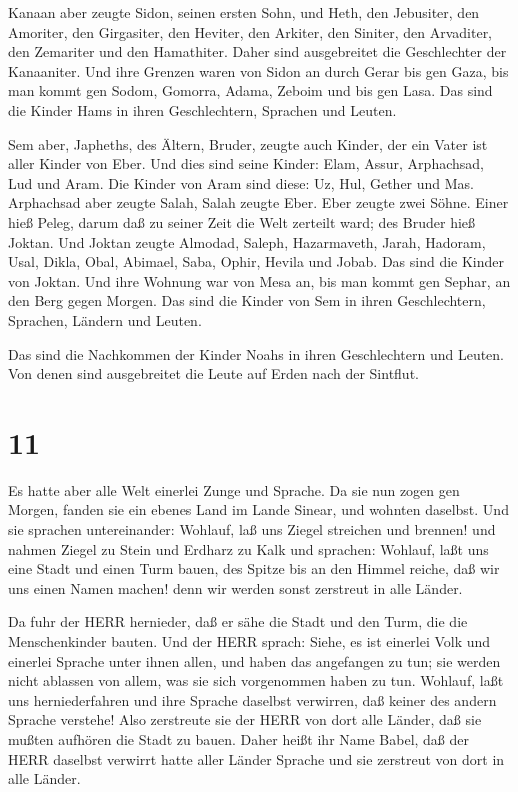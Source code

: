  Kanaan aber zeugte Sidon, seinen ersten Sohn, und Heth,
 den Jebusiter, den Amoriter, den Girgasiter, 
den Heviter, den Arkiter, den Siniter,  den Arvaditer, den
Zemariter und den Hamathiter. Daher sind ausgebreitet die Geschlechter
der Kanaaniter.  Und ihre Grenzen waren von Sidon an durch
Gerar bis gen Gaza, bis man kommt gen Sodom, Gomorra, Adama, Zeboim und
bis gen Lasa.  Das sind die Kinder Hams in ihren
Geschlechtern, Sprachen und Leuten.

 Sem aber, Japheths, des Ältern, Bruder, zeugte auch
Kinder, der ein Vater ist aller Kinder von Eber.  Und dies
sind seine Kinder: Elam, Assur, Arphachsad, Lud und Aram. 
Die Kinder von Aram sind diese: Uz, Hul, Gether und Mas. 
Arphachsad aber zeugte Salah, Salah zeugte Eber.  Eber
zeugte zwei Söhne. Einer hieß Peleg, darum daß zu seiner Zeit die Welt
zerteilt ward; des Bruder hieß Joktan.  Und Joktan zeugte
Almodad, Saleph, Hazarmaveth, Jarah,  Hadoram, Usal, Dikla,
 Obal, Abimael, Saba,  Ophir, Hevila und
Jobab. Das sind die Kinder von Joktan.  Und ihre Wohnung
war von Mesa an, bis man kommt gen Sephar, an den Berg gegen Morgen.
 Das sind die Kinder von Sem in ihren Geschlechtern,
Sprachen, Ländern und Leuten.

 Das sind die Nachkommen der Kinder Noahs in ihren
Geschlechtern und Leuten. Von denen sind ausgebreitet die Leute auf
Erden nach der Sintflut.

\hypertarget{section-10}{%
\section{11}\label{section-10}}

 Es hatte aber alle Welt einerlei Zunge und Sprache.
 Da sie nun zogen gen Morgen, fanden sie ein ebenes Land im
Lande Sinear, und wohnten daselbst.  Und sie sprachen
untereinander: Wohlauf, laß uns Ziegel streichen und brennen! und nahmen
Ziegel zu Stein und Erdharz zu Kalk  und sprachen: Wohlauf,
laßt uns eine Stadt und einen Turm bauen, des Spitze bis an den Himmel
reiche, daß wir uns einen Namen machen! denn wir werden sonst zerstreut
in alle Länder.

 Da fuhr der HERR hernieder, daß er sähe die Stadt und den
Turm, die die Menschenkinder bauten.  Und der HERR sprach:
Siehe, es ist einerlei Volk und einerlei Sprache unter ihnen allen, und
haben das angefangen zu tun; sie werden nicht ablassen von allem, was
sie sich vorgenommen haben zu tun.  Wohlauf, laßt uns
herniederfahren und ihre Sprache daselbst verwirren, daß keiner des
andern Sprache verstehe!  Also zerstreute sie der HERR von
dort alle Länder, daß sie mußten aufhören die Stadt zu bauen.
 Daher heißt ihr Name Babel, daß der HERR daselbst verwirrt
hatte aller Länder Sprache und sie zerstreut von dort in alle Länder.

